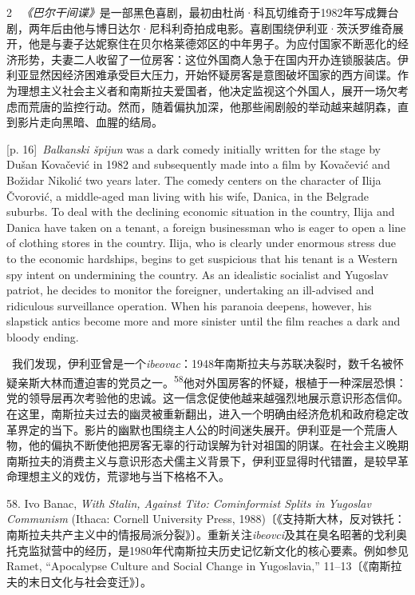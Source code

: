 \documentclass[10pt,a4paper]{article}
\begin{document}
\begin{paracol}{2}
\switchcolumn*
{\scriptsize\color{gray} [p. 16]}\ \textit{《巴尔干间谍》}是一部黑色喜剧，最初由杜尚·科瓦切维奇于1982年写成舞台剧，两年后由他与博日达尔·尼科利奇拍成电影。喜剧围绕伊利亚·茨沃罗维奇展开，他是与妻子达妮察住在贝尔格莱德郊区的中年男子。为应付国家不断恶化的经济形势，夫妻二人收留了一位房客：这位外国商人急于在国内开办连锁服装店。伊利亚显然因经济困难承受巨大压力，开始怀疑房客是意图破坏国家的西方间谍。作为理想主义社会主义者和南斯拉夫爱国者，他决定监视这个外国人，展开一场欠考虑而荒唐的监控行动。然而，随着偏执加深，他那些闹剧般的举动越来越阴森，直到影片走向黑暗、血腥的结局。\par
\switchcolumn
{\scriptsize\color{gray} [p. 16]}\ \textit{Balkanski špijun} was a dark comedy initially written for the stage by Dušan Kovačević in 1982 and subsequently made into a film by Kovačević and Božidar Nikolić two years later. The comedy centers on the character of Ilija Čvorović, a middle-aged man living with his wife, Danica, in the Belgrade suburbs. To deal with the declining economic situation in the country, Ilija and Danica have taken on a tenant, a foreign businessman who is eager to open a line of clothing stores in the country. Ilija, who is clearly under enormous stress due to the economic hardships, begins to get suspicious that his tenant is a Western spy intent on undermining the country. As an idealistic socialist and Yugoslav patriot, he decides to monitor the foreigner, undertaking an ill-advised and ridiculous surveillance operation. When his paranoia deepens, however, his slapstick antics become more and more sinister until the film reaches a dark and bloody ending.\par
\switchcolumn*
{\scriptsize\color{gray} [p. 16]}\ 我们发现，伊利亚曾是一个\textit{ibeovac}：1948年南斯拉夫与苏联决裂时，数千名被怀疑亲斯大林而遭迫害的党员之\mbox{一。\textsuperscript{58}}他对外国房客的怀疑，根植于一种深层恐惧：党的领导层再次考验他的忠诚。这一信念促使他越来越强烈地展示意识形态信仰。在这里，南斯拉夫过去的幽灵被重新翻出，进入一个明确由经济危机和政府稳定改革界定的当下。影片的幽默也围绕主人公的时间迷失展开。伊利亚是一个荒唐人物，他的偏执不断使他把房客无辜的行动误解为针对祖国的阴谋。在社会主义晚期南斯拉夫的消费主义与意识形态犬儒主义背景下，伊利亚显得时代错置，是较早革命理想主义的戏仿，荒谬地与当下格格不入。\par{\small 58. Ivo Banac, \textit{With Stalin, Against Tito: Cominformist Splits in Yugoslav Communism} (Ithaca: Cornell University Press, 1988)〔《支持斯大林，反对铁托：南斯拉夫共产主义中的情报局派分裂》〕。重新关注\textit{ibeovci}及其在臭名昭著的戈利奥托克监狱营中的经历，是1980年代南斯拉夫历史记忆新文化的核心要素。例如参见Ramet, “Apocalypse Culture and Social Change in Yugoslavia,” 11–13〔《南斯拉夫的末日文化与社会变迁》〕。\par}

\end{paracol}
\end{document}
